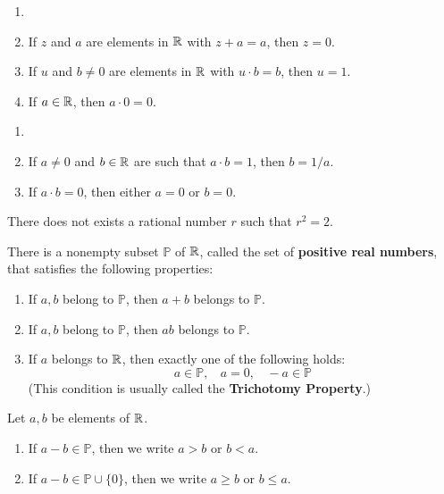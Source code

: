 \begin{theorem}
	\begin{enumerate}
		\item[]
		\item If $z$ and $a$ are elements in $\mathbb{R}$ with $z+a=a$, then $z=0$.

		\item If $u$ and $b \neq 0$ are elements in $\mathbb{R}$ with $u \cdot b=b$, then $u=1$.

		\item If $a \in \mathbb{R}$, then $a \cdot 0=0$.
	\end{enumerate}
\end{theorem}

\begin{theorem}
	\begin{enumerate}
		\item[]
		\item If $a \neq 0$ and $b \in \mathbb{R}$ are such that $a \cdot b = 1$, then $b = 1/a$.

		\item If $a \cdot b = 0$, then either $a=0$ or $b=0$.
	\end{enumerate}
\end{theorem}

\begin{theorem}
	There does not exists a rational number $r$ such that $r^2=2$.
\end{theorem}

\begin{definition}
	There is a nonempty subset $\mathbb{P}$ of $\mathbb{R}$, called the set of \textbf{positive real numbers}, that satisfies the following properties:
	\begin{enumerate}
		\item If $a,b$ belong to $\mathbb{P}$, then $a+b$ belongs to $\mathbb{P}$.

		\item If $a,b$ belong to $\mathbb{P}$, then $ab$ belongs to $\mathbb{P}$.

		\item If $a$ belongs to $\mathbb{R}$, then exactly one of the following holds:
		      \[a \in \mathbb{P},\ \ \ \ a=0,\ \ \ \ -a \in \mathbb{P}\]
		      (This condition is usually called the \textbf{Trichotomy Property}.)
	\end{enumerate}
\end{definition}

\begin{definition}
	Let $a,b$ be elements of $\mathbb{R}$.
	\begin{enumerate}
		\item If $a-b \in \mathbb{P}$, then we write $a >b$ or $b < a$.
		\item If $a-b \in \mathbb{P} \cup \{0\}$, then we write $a \geq b$ or $b \leq a$.
	\end{enumerate}
\end{definition}

